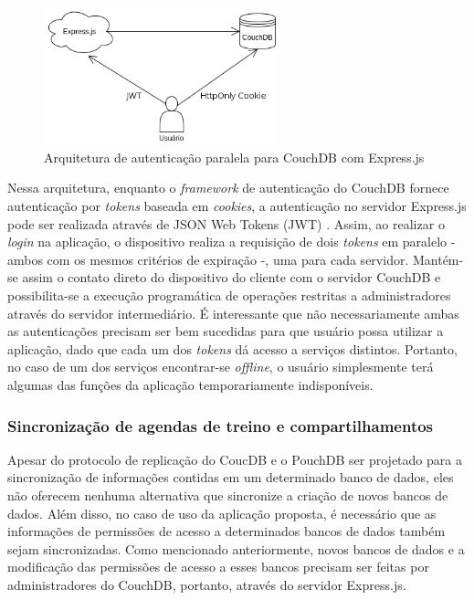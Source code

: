 \documentclass[
	article,			%
	12pt,				%
	oneside,			%
	a4paper,			%
	english,			%
	brazil,				%
	sumario=tradicional
	]{abntex2}
\begin{document}
\begin{figure}[H]
	\centering
	\caption{Arquitetura de autenticação paralela para CouchDB com Express.js}
	\includegraphics[width=0.6\textwidth]{figures/couchdb-express-proxy-scheme-update}
\end{figure}

Nessa arquitetura, enquanto o \textit{framework} de autenticação do CouchDB fornece autenticação por \textit{tokens} baseada em \textit{cookies}, a autenticação no servidor Express.js pode ser realizada através de JSON Web Tokens (JWT) \cite{jwt-2017}. Assim, ao realizar o \textit{login} na aplicação, o dispositivo realiza a requisição de dois \textit{tokens} em paralelo - ambos com os mesmos critérios de expiração -, uma para cada servidor. Mantém-se assim o contato direto do dispositivo do cliente com o servidor CouchDB e possibilita-se a execução programática de operações restritas a administradores através do servidor intermediário. É interessante que não necessariamente ambas as autenticações precisam ser bem sucedidas para que usuário possa utilizar a aplicação, dado que cada um dos \textit{tokens} dá acesso a serviços distintos. Portanto, no caso de um dos serviços encontrar-se \textit{offline}, o usuário simplesmente terá algumas das funções da aplicação temporariamente indisponíveis.

\subsubsection{Sincronização de agendas de treino e compartilhamentos}

Apesar do protocolo de replicação do CoucDB e o PouchDB ser projetado para a sincronização de informações contidas em um determinado banco de dados, eles não oferecem nenhuma alternativa que sincronize a criação de novos bancos de dados. Além disso, no caso de uso da aplicação proposta, é necessário que as informações de permissões de acesso a determinados bancos de dados também sejam sincronizadas. Como mencionado anteriormente, novos bancos de dados e a modificação das permissões de acesso a esses bancos precisam ser feitas por administradores do CouchDB, portanto, através do servidor Express.js.
\end{document}
